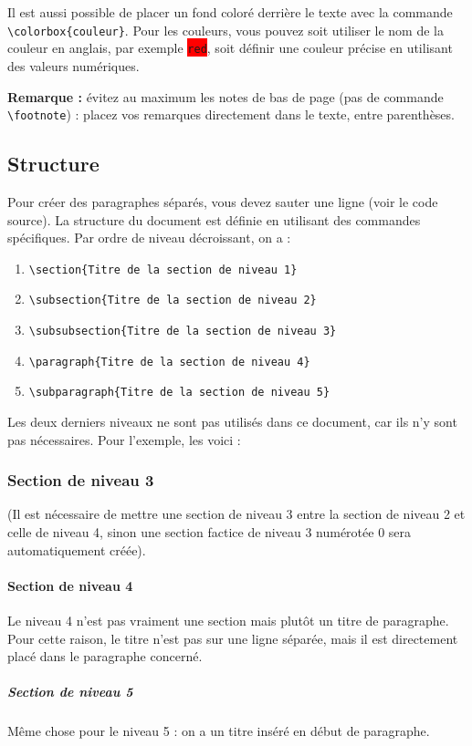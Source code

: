 \documentclass{ASD}
\begin{document}
Il est aussi possible de placer un fond coloré derrière le texte avec la commande \texttt{\textbackslash{}colorbox\{couleur\}}. Pour les couleurs, vous pouvez soit utiliser le nom de la couleur en anglais, par exemple \colorbox{red}{\texttt{red}}, soit définir une couleur précise en utilisant des valeurs numériques.

\textbf{Remarque :} évitez au maximum les notes de bas de page (pas de commande \texttt{\textbackslash{}footnote}) : placez vos remarques directement dans le texte, entre parenthèses.

\subsection{Structure}
\label{sec:structure}
Pour créer des paragraphes séparés, vous devez sauter une ligne (voir le code source). La structure du document est définie en utilisant des commandes spécifiques. Par ordre de niveau décroissant, on a :
\begin{enumerate}
	\item \texttt{\textbackslash{}section\{Titre de la section de niveau 1\}}
	\item \texttt{\textbackslash{}subsection\{Titre de la section de niveau 2\}}
	\item \texttt{\textbackslash{}subsubsection\{Titre de la section de niveau 3\}}
	\item \texttt{\textbackslash{}paragraph\{Titre de la section de niveau 4\}}
	\item \texttt{\textbackslash{}subparagraph\{Titre de la section de niveau 5\}}
\end{enumerate}

Les deux derniers niveaux ne sont pas utilisés dans ce document, car ils n'y sont pas nécessaires. Pour l'exemple, les voici :
\subsubsection{Section de niveau 3}
(Il est nécessaire de mettre une section de niveau 3 entre la section de niveau 2 et celle de niveau 4, sinon une section factice de niveau 3 numérotée 0 sera automatiquement créée).
\paragraph{Section de niveau 4}
Le niveau 4 n'est pas vraiment une section mais plutôt un titre de paragraphe. Pour cette raison, le titre n'est pas sur une ligne séparée, mais il est directement placé dans le paragraphe concerné.
\subparagraph{Section de niveau 5}
Même chose pour le niveau 5 : on a un titre inséré en début de paragraphe.
	
\end{document}
